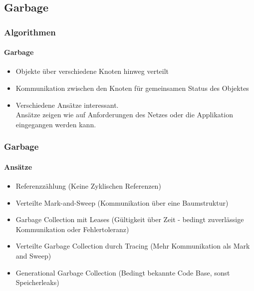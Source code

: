 \subsection{Garbage}
\begin{frame}
  \frametitle{Algorithmen}
  \framesubtitle{Garbage}
  \begin{itemize}
    \item Objekte über verschiedene Knoten hinweg verteilt
    \item Kommunikation zwischen den Knoten für gemeinsamen Status des Objektes
    \item Verschiedene Ansätze interessant. \\Ansätze zeigen wie auf Anforderungen des Netzes oder die Applikation eingegangen werden kann.
  \end{itemize}
\end{frame}


\begin{frame}
  \frametitle{Garbage}
  \framesubtitle{Ansätze}
  \begin{itemize}
    \item Referenzzählung (Keine Zyklischen Referenzen)
    \item Verteilte Mark-and-Sweep (Kommunikation über eine Baumstruktur)
    \item Garbage Collection mit Leases (Gültigkeit über Zeit - bedingt zuverlässige Kommunikation oder Fehlertoleranz)
    \item  Verteilte Garbage Collection durch Tracing (Mehr Kommunikation als Mark and Sweep)
    \item Generational Garbage Collection (Bedingt bekannte Code Base, sonst Speicherleaks)
  \end{itemize}
\end{frame}
